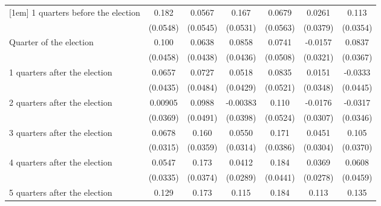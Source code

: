 \begin{table}[htbp]
\begin{tabular}{l*{6}{c}}
[1em]
 1 quarters before the election&       0.182\sym{***}&      0.0567         &       0.167\sym{**} &      0.0679         &      0.0261         &       0.113\sym{**} \\
                    &    (0.0548)         &    (0.0545)         &    (0.0531)         &    (0.0563)         &    (0.0379)         &    (0.0354)         \\
[1em]
Quarter of the election&       0.100\sym{*}  &      0.0638         &      0.0858\sym{*}  &      0.0741         &     -0.0157         &      0.0837\sym{*}  \\
                    &    (0.0458)         &    (0.0438)         &    (0.0436)         &    (0.0508)         &    (0.0321)         &    (0.0367)         \\
[1em]
 1 quarters after the election&      0.0657         &      0.0727         &      0.0518         &      0.0835         &      0.0151         &     -0.0333         \\
                    &    (0.0435)         &    (0.0484)         &    (0.0429)         &    (0.0521)         &    (0.0348)         &    (0.0445)         \\
[1em]
 2 quarters after the election&     0.00905         &      0.0988\sym{*}  &    -0.00383         &       0.110\sym{*}  &     -0.0176         &     -0.0317         \\
                    &    (0.0369)         &    (0.0491)         &    (0.0398)         &    (0.0524)         &    (0.0307)         &    (0.0346)         \\
[1em]
 3 quarters after the election&      0.0678\sym{*}  &       0.160\sym{***}&      0.0550         &       0.171\sym{***}&      0.0451         &       0.105\sym{**} \\
                    &    (0.0315)         &    (0.0359)         &    (0.0314)         &    (0.0386)         &    (0.0304)         &    (0.0370)         \\
[1em]
 4 quarters after the election&      0.0547         &       0.173\sym{***}&      0.0412         &       0.184\sym{***}&      0.0369         &      0.0608         \\
                    &    (0.0335)         &    (0.0374)         &    (0.0289)         &    (0.0441)         &    (0.0278)         &    (0.0459)         \\
[1em]
 5 quarters after the election&       0.129\sym{***}&       0.173\sym{***}&       0.115\sym{**} &       0.184\sym{***}&       0.113\sym{***}&       0.135\sym{**} \\

\end{tabular}
\end{table}
